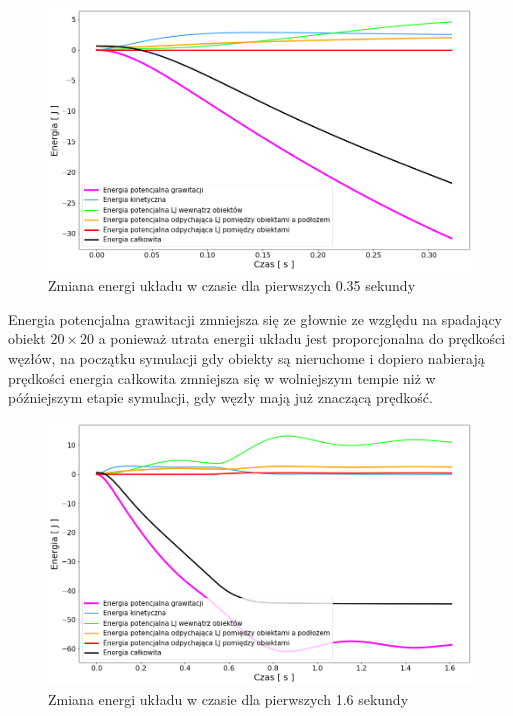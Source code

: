 \documentclass[12pt, letterpaper]{report}
\begin{document}
    \begin{figure}[H]
        \centering
        \includegraphics[width=16cm]{pressure_energy02_01}
        \caption{
            Zmiana energi układu w czasie dla pierwszych 0.35 sekundy
        }
    \end{figure}
    
    Energia potencjalna grawitacji zmniejsza się ze głownie ze względu na spadający obiekt $20 \times 20$
    a ponieważ utrata energii układu jest proporcjonalna do prędkości węzłów, na początku symulacji gdy 
    obiekty są nieruchome i dopiero nabierają prędkości energia całkowita zmniejsza się w wolniejszym tempie niż 
    w późniejszym etapie symulacji, gdy węzły mają już znaczącą prędkość.

    \begin{figure}[H]
        \centering
        \includegraphics[width=16cm]{pressure_energy02_02}
        \caption{
            Zmiana energi układu w czasie dla pierwszych 1.6 sekundy
        }
    \end{figure}
\end{document}
